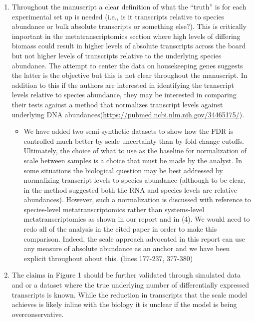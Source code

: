 \documentclass[
]{article}
\providecommand{\tightlist}{%
  \setlength{\itemsep}{0pt}\setlength{\parskip}{0pt}}
\begin{document}
\begin{enumerate}
\def\labelenumi{\arabic{enumi}.}
\item
  Throughout the manuscript a clear definition of what the ``truth'' is
  for each experimental set up is needed (i.e., is it transcripts
  relative to species abundance or bulk absolute transcripts or
  something else?). This is critically important in the
  metatranscriptomics section where high levels of differing biomass
  could result in higher levels of absolute transcripts across the board
  but not higher levels of transcripts relative to the underlying
  species abundance. The attempt to center the data on housekeeping
  genes suggests the latter is the objective but this is not clear
  throughout the manuscript. In addition to this if the authors are
  interested in identifying the transcript levels relative to species
  abundance, they may be interested in comparing their tests against a
  method that normalizes transcript levels against underlying DNA
  abundances(\url{https://pubmed.ncbi.nlm.nih.gov/34465175/}).

  \begin{itemize}
  \tightlist
  \item
    We have added two semi-synthetic datasets to show how the FDR is
    controlled much better by scale uncertainty than by fold-change
    cutoffs. Ultimately, the choice of what to use as the baseline for
    normalization of scale between samples is a choice that must be made
    by the analyst. In some situations the biological question may be
    best addressed by normalizing transcript levels to species abundance
    (although to be clear, in the method suggested both the RNA and
    species levels are relative abundances). However, such a
    normalization is discussed with reference to species-level
    metatranscriptomics rather than systems-level metatranscriptomics as
    shown in our report and in (4). We would need to redo all of the
    analysis in the cited paper in order to make this comparison.
    Indeed, the scale approach advocated in this report can use any
    measure of absolute abundance as an anchor and we have been explicit
    throughout about this. (lines 177-237, 377-380)
  \end{itemize}
\item
  The claims in Figure 1 should be further validated through simulated
  data and or a dataset where the true underlying number of
  differentially expressed transcripts is known. While the reduction in
  transcripts that the scale model achieves is likely inline with the
  biology it is unclear if the model is being overconservative.


\end{enumerate}
\end{document}
